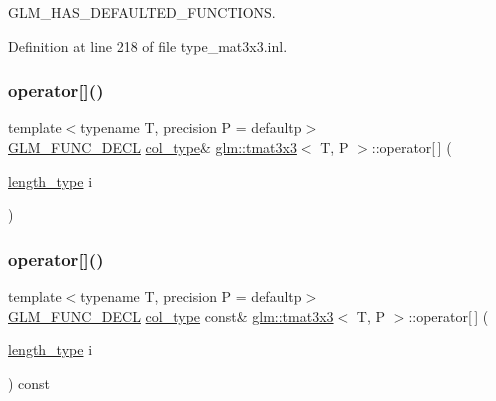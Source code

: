 G\+L\+M\+\_\+\+H\+A\+S\+\_\+\+D\+E\+F\+A\+U\+L\+T\+E\+D\+\_\+\+F\+U\+N\+C\+T\+I\+O\+NS. 



Definition at line 218 of file type\+\_\+mat3x3.\+inl.

\mbox{\label{structglm_1_1tmat3x3_a168abb413d19f4ff78005b4a4015c9e1}} 
\subsubsection{\texorpdfstring{operator[]()}{operator[]()}\hspace{0.1cm}{\footnotesize\ttfamily [1/2]}}
{\footnotesize\ttfamily template$<$typename T, precision P = defaultp$>$ \\
\mbox{\hyperlink{setup_8hpp_ab2d052de21a70539923e9bcbf6e83a51}{G\+L\+M\+\_\+\+F\+U\+N\+C\+\_\+\+D\+E\+CL}} \mbox{\hyperlink{structglm_1_1tmat3x3_a0b80bddb3cb4e01aa04d1c7a5a47365a}{col\+\_\+type}}\& \mbox{\hyperlink{structglm_1_1tmat3x3}{glm\+::tmat3x3}}$<$ T, P $>$\+::operator\mbox{[}$\,$\mbox{]} (\begin{DoxyParamCaption}\item[{\mbox{\hyperlink{structglm_1_1tmat3x3_a78fa6e6e406213fa0049b5125b2686b5}{length\+\_\+type}}}]{i }\end{DoxyParamCaption})}

\mbox{\label{structglm_1_1tmat3x3_ac5c2bd620ce28afd0fce23119765049e}} 
\subsubsection{\texorpdfstring{operator[]()}{operator[]()}\hspace{0.1cm}{\footnotesize\ttfamily [2/2]}}
{\footnotesize\ttfamily template$<$typename T, precision P = defaultp$>$ \\
\mbox{\hyperlink{setup_8hpp_ab2d052de21a70539923e9bcbf6e83a51}{G\+L\+M\+\_\+\+F\+U\+N\+C\+\_\+\+D\+E\+CL}} \mbox{\hyperlink{structglm_1_1tmat3x3_a0b80bddb3cb4e01aa04d1c7a5a47365a}{col\+\_\+type}} const\& \mbox{\hyperlink{structglm_1_1tmat3x3}{glm\+::tmat3x3}}$<$ T, P $>$\+::operator\mbox{[}$\,$\mbox{]} (\begin{DoxyParamCaption}\item[{\mbox{\hyperlink{structglm_1_1tmat3x3_a78fa6e6e406213fa0049b5125b2686b5}{length\+\_\+type}}}]{i }\end{DoxyParamCaption}) const}



